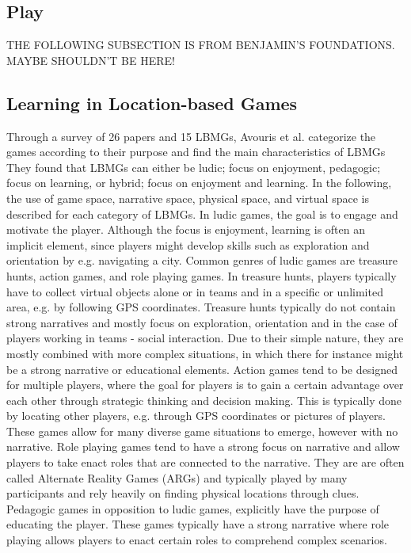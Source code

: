 \subsection{Play}

THE FOLLOWING SUBSECTION IS FROM BENJAMIN'S FOUNDATIONS. MAYBE SHOULDN'T BE HERE!
\subsection{Learning in Location-based Games}
Through a survey of 26 papers and 15 LBMGs, Avouris et
al. categorize the games according to their purpose and find
the main characteristics of LBMGs
They found that LBMGs can either be ludic; focus
on enjoyment, pedagogic; focus on learning, or hybrid;
focus on enjoyment and learning. In the following, the use of
game space, narrative space, physical space, and virtual space
is described for each category of LBMGs.
In ludic games, the goal is to engage and motivate the player.
Although the focus is enjoyment, learning is often an implicit
element, since players might develop skills such as exploration
and orientation by e.g. navigating a city. Common
genres of ludic games are treasure hunts, action games, and
role playing games.
In treasure hunts, players typically have to collect virtual objects
alone or in teams and in a specific or unlimited area, e.g.
by following GPS coordinates. Treasure hunts typically do
not contain strong narratives and mostly focus on exploration,
orientation and in the case of players working in teams - social
interaction. Due to their simple nature, they are mostly
combined with more complex situations, in which there for
instance might be a strong narrative or educational elements.
Action games tend to be designed for multiple players, where
the goal for players is to gain a certain advantage over each
other through strategic thinking and decision making. This
is typically done by locating other players, e.g. through GPS
coordinates or pictures of players. These games allow for
many diverse game situations to emerge, however with no
narrative.
Role playing games tend to have a strong focus on narrative
and allow players to take enact roles that are connected to the
narrative. They are are often called Alternate Reality Games
(ARGs) and typically played by many participants and rely
heavily on finding physical locations through clues.
Pedagogic games in opposition to ludic games, explicitly
have the purpose of educating the player. These games typically
have a strong narrative where role playing allows players
to enact certain roles to comprehend complex scenarios.
